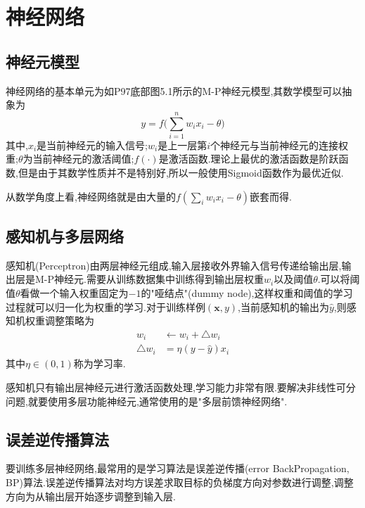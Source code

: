 \chapter{神经网络}

\section{神经元模型}

神经网络的基本单元为如P97底部图5.1所示的M-P神经元模型,其数学模型可以抽象为
\begin{equation}
y=f\Big(\sum_{i=1}^nw_ix_i-\theta\Big)
\end{equation}
其中,$x_i$是当前神经元的输入信号;$w_i$是上一层第$i$个神经元与当前神经元的连接权重;$\theta$为当前神经元的激活阈值;$f(\cdot)$是激活函数.理论上最优的激活函数是阶跃函数,但是由于其数学性质并不是特别好,所以一般使用Sigmoid函数作为最优近似.

从数学角度上看,神经网络就是由大量的$f(\sum_iw_ix_i-\theta)$嵌套而得.

\section{感知机与多层网络}

感知机(Perceptron)由两层神经元组成,输入层接收外界输入信号传递给输出层,输出层是M-P神经元.需要从训练数据集中训练得到输出层权重$w_i$以及阈值$\theta$.可以将阈值$\theta$看做一个输入权重固定为$-1$的"哑结点"(dummy node),这样权重和阈值的学习过程就可以归一化为权重的学习.对于训练样例$(\mathbf x,y)$,当前感知机的输出为$\hat y$,则感知机权重调整策略为
\begin{equation}\begin{split}
w_i&\leftarrow w_i+\bigtriangleup w_i \\
\bigtriangleup w_i&=\eta(y-\hat y)x_i
\end{split}\end{equation}
其中$\eta\in (0,1)$称为学习率.

感知机只有输出层神经元进行激活函数处理,学习能力非常有限.要解决非线性可分问题,就要使用多层功能神经元,通常使用的是"多层前馈神经网络".

\section{误差逆传播算法}

要训练多层神经网络,最常用的是学习算法是误差逆传播(error BackPropagation, BP)算法.误差逆传播算法对均方误差求取目标的负梯度方向对参数进行调整,调整方向为从输出层开始逐步调整到输入层.

